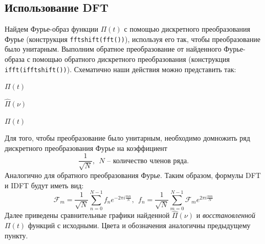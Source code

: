 \documentclass[a4paper, 12pt]{article}
\begin{document}
    \subsection{Использование DFT}
    Найдем Фурье-образ функции $\Pi(t)$ с помощью дискретного преобразования Фурье (конструкция \texttt{fftshift(fft())}), используя его так,
    чтобы преобразование было унитарным. Выполним обратное преобразование от
    найденного Фурье-образа с помощью обратного дискретного преобразования (конструкция \texttt{ifft(ifftshift())}). Схематично наши действия можно представить так:
    \begin{center}
        $\Pi(t)$
        $\hat{\Pi}(\nu)$
        $\Pi(t)$
    \end{center}


    Для того, чтобы преобразование было унитарным, необходимо домножить ряд дискретного преобразования Фурье
    на коэффициент $$\dfrac{1}{\sqrt{N}},\ \ N \text{ -- количество членов ряда.}$$ Аналогично для обратного преобразования Фурье. Таким образом, формулы DFT и IDFT будут
    иметь вид:
    $$
    \mathcal{F}_m = \dfrac{1}{\sqrt{N}}\sum\limits_{n=0}^{N-1}f_ne^{-2\pi i \frac{mn}{N}},\ \ f_n=\dfrac{1}{\sqrt{N}}\sum\limits_{m=0}^{N-1}\mathcal{F}_me^{2\pi i\frac{mn}{N}}
    $$
    Далее приведены сравнительные графики найденной $\hat{\Pi}(\nu)$ и \textit{восстановленной} $\Pi(t)$ функций с исходными. Цвета и обозначения аналогичны предыдущему пункту.
\end{document}
